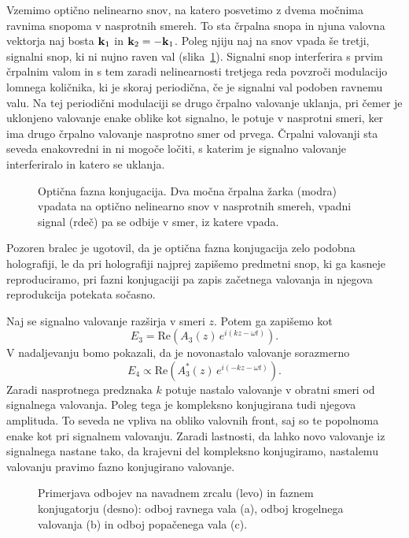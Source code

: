 Vzemimo optično nelinearno snov, na katero posvetimo z dvema močnima ravnima
snopoma v nasprotnih smereh. To sta črpalna snopa in njuna valovna vektorja 
naj bosta ${\bf k}_{1}$ in ${\bf k}_2 = -{\bf k}_{1}$. Poleg njiju naj na snov vpada
še tretji, signalni snop, ki ni nujno raven val (slika~\ref{08_OPC1}). 
Signalni snop interferira s prvim črpalnim valom in s tem zaradi nelinearnosti 
tretjega reda povzroči modulacijo lomnega količnika, ki je skoraj periodična, če
je signalni val podoben ravnemu valu. Na tej periodični modulaciji se
drugo črpalno valovanje uklanja, pri čemer je uklonjeno valovanje enake oblike
kot signalno, le potuje v nasprotni smeri, ker ima drugo črpalno valovanje
nasprotno smer od prvega. Črpalni valovanji sta seveda enakovredni in ni
mogoče ločiti, s katerim je signalno valovanje interferiralo in katero se
uklanja.
\begin{figure}[h]
\centering
\def\svgwidth{60truemm} 

\caption{Optična fazna konjugacija. Dva močna črpalna žarka (modra) vpadata 
na optično nelinearno snov v nasprotnih smereh, vpadni signal (rdeč) pa se odbije v 
smer, iz katere vpada.}
\label{08_OPC1}
\end{figure}
\begin{remark}Pozoren bralec je ugotovil, da je optična fazna konjugacija zelo 
podobna holografiji, le da pri holografiji najprej zapišemo predmetni snop, 
ki ga kasneje reproduciramo, pri fazni konjugaciji pa zapis začetnega valovanja in 
njegova reprodukcija potekata sočasno. 
\end{remark}

Naj se signalno valovanje razširja v smeri $z$. Potem ga zapišemo kot  
\begin{equation}
E_{3}=\mathrm{Re}\left(A_3\left(z\right)\, e^{i\left(kz-\omega t\right)}\right).
\label{8.97}
\end{equation}
V nadaljevanju bomo pokazali, da je novonastalo valovanje sorazmerno
\begin{equation}
E_{4} \propto \mathrm{Re}\left(A_3^{*}\left(z\right)\, e^{i\left(-kz-\omega t\right)}\right).
\label{8.98}
\end{equation}
Zaradi nasprotnega predznaka $k$ potuje nastalo valovanje v obratni smeri od signalnega
valovanja. Poleg tega je kompleksno konjugirana tudi njegova amplituda. To seveda
ne vpliva na obliko valovnih front, saj so te popolnoma enake kot pri signalnem
valovanju. Zaradi lastnosti, da lahko novo valovanje iz signalnega nastane tako,
da krajevni del kompleksno konjugiramo, nastalemu valovanju pravimo fazno
konjugirano valovanje.
\begin{figure}[h!]
\centering
\def\svgwidth{75truemm} 

\caption{Primerjava odbojev na navadnem zrcalu (levo) in faznem konjugatorju (desno): odboj ravnega
vala (a), odboj krogelnega valovanja (b) in odboj popačenega vala (c).}
\label{08_OPC2}
\end{figure}

